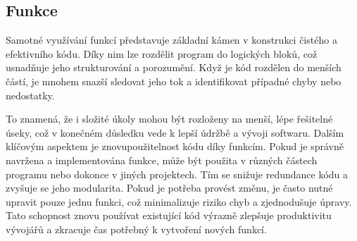 \documentclass{article}
\begin{document}
\begin{Čistý kód - Funkce}
        \clearpage



        \section{Funkce}\label{sec:funkce}
        Samotné využívání funkcí představuje základní kámen v konstrukci čistého a efektivního kódu.
        Díky nim lze rozdělit program do logických bloků, což usnadňuje jeho strukturování a porozumění.
        Když je kód rozdělen do menších částí, je mnohem snazší sledovat jeho tok a identifikovat případné chyby nebo nedostatky.

        To znamená, že i složité úkoly mohou být rozloženy na menší, lépe řešitelné úseky, což v konečném důsledku vede k lepší údržbě a vývoji softwaru.
        Dalším klíčovým aspektem je znovupoužitelnost kódu díky funkcím.
        Pokud je správně navržena a implementována funkce, může být použita v různých částech programu nebo dokonce v jiných projektech.
        Tím se snižuje redundance kódu a zvyšuje se jeho modularita.
        Pokud je potřeba provést změnu, je často nutné upravit pouze jednu funkci, což minimalizuje riziko chyb a zjednodušuje úpravy.
        Tato schopnost znovu používat existující kód výrazně zlepšuje produktivitu vývojářů a zkracuje čas potřebný k vytvoření nových funkcí.


\end{Čistý kód - Funkce}
\end{document}
